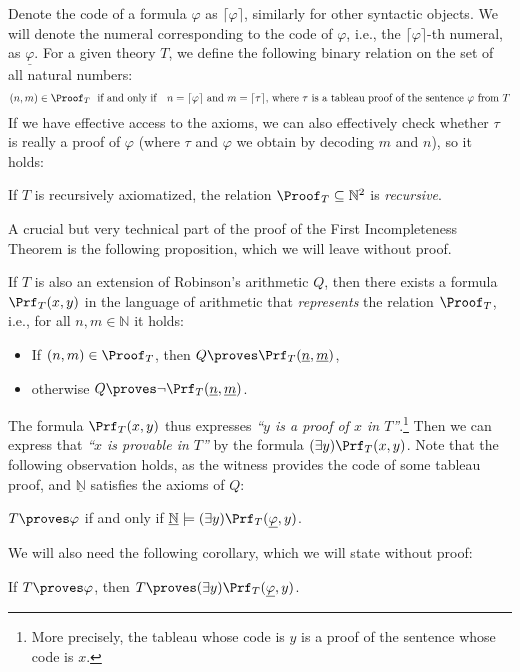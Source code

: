     Denote the code of a formula $\varphi$ as $\lceil\varphi\rceil$, similarly for other syntactic objects. We will denote the numeral corresponding to the code of $\varphi$, i.e., the $\lceil\varphi\rceil$-th numeral, as $\underline{\varphi}$. For a given theory $T$, we define the following binary relation on the set of all natural numbers:
    $$
    (n,m)\in\Proof_T\ \text{ if and only if \ \ $n=\lceil\varphi\rceil$ and $m=\lceil\tau\rceil$, where $\tau$ is a tableau proof of the sentence $\varphi$ from $T$}
    $$
    If we have effective access to the axioms, we can also effectively check whether $\tau$ is really a proof of $\varphi$ (where $\tau$ and $\varphi$ we obtain by decoding $m$ and $n$), so it holds:
    \begin{observation}
    If $T$ is recursively axiomatized, the relation $\Proof_T\subseteq\mathbb N^2$ is \emph{recursive}. 
    \end{observation}
    
    A crucial but very technical part of the proof of the First Incompleteness Theorem is the following proposition, which we will leave without proof.
    
    \begin{proposition}
    If $T$ is also an extension of Robinson's arithmetic $Q$, then there exists a formula $\Prf_T(x,y)$ in the language of arithmetic that \emph{represents} the relation $\Proof_T$, i.e., for all $n,m\in\mathbb N$ it holds:
    \begin{itemize}
        \item If $(n,m)\in\Proof_T$, then $Q\proves\Prf_T(\underline{n},\underline{m})$,
        \item otherwise $Q\proves\neg\Prf_T(\underline{n},\underline{m})$.
    \end{itemize} 
    \end{proposition}
    
    The formula $\Prf_T(x,y)$ thus expresses \emph{``$y$ is a proof of $x$ in $T$''}.\footnote{More precisely, the tableau whose code is $y$ is a proof of the sentence whose code is $x$.} Then we can express that \emph{``$x$ is provable in $T$''} by the formula $(\exists y)\Prf_T(x,y)$. Note that the following observation holds, as the witness provides the code of some tableau proof, and $\underline{\mathbb N}$ satisfies the axioms of $Q$:
    \begin{observation}\label{observation:proof-predicate}
    $T\proves\varphi$ if and only if $\underline{\mathbb N}\models (\exists y)\Prf_T(\underline{\varphi},y)$.  
    \end{observation}
    We will also need the following corollary, which we will state without proof:
    \begin{corollary}\label{corollary:predicate-of-provability}
        If $T\proves\varphi$, then $T\proves (\exists y)\Prf_T(\underline{\varphi},y)$.
    \end{corollary}
    
